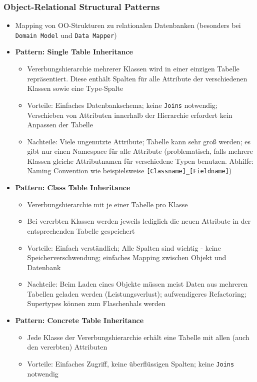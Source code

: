 \subsubsection{Object-Relational Structural Patterns}
\begin{itemize}
	\item Mapping von OO-Strukturen zu relationalen Datenbanken (besonders bei \texttt{Domain Model} und \texttt{Data Mapper})
	\item \textbf{Pattern: Single Table Inheritance}
	\begin{itemize}
		\item Vererbungshierarchie mehrerer Klassen wird in einer einzigen Tabelle repräsentiert. Diese enthält Spalten für alle Attribute der verschiedenen Klassen sowie eine Type-Spalte
		\item Vorteile: Einfaches Datenbankschema; keine \texttt{Joins} notwendig; Verschieben von Attributen innerhalb der Hierarchie erfordert kein Anpassen der Tabelle
		\item Nachteile: Viele ungenutzte Attribute; Tabelle kann sehr groß werden; es gibt nur einen Namespace für alle Attribute (problematisch, falls mehrere Klassen gleiche Attributnamen für verschiedene Typen benutzen. Abhilfe: Naming Convention wie beispielsweise \texttt{[Classname]\_[Fieldname]})
	\end{itemize}
	\item \textbf{Pattern: Class Table Inheritance}
	\begin{itemize}
		\item Vererbungshierarchie mit je einer Tabelle pro Klasse
		\item Bei vererbten Klassen werden jeweils lediglich die neuen Attribute in der entsprechenden Tabelle gespeichert
		\item Vorteile: Einfach verständlich; Alle Spalten sind wichtig - keine Speicherverschwendung; einfaches Mapping zwischen Objekt und Datenbank
		\item Nachteile: Beim Laden eines Objekte müssen meist Daten aus mehreren Tabellen geladen werden (Leistungsverlust); aufwendigeres Refactoring; Supertypes können zum Flaschenhals werden
	\end{itemize}
	\item \textbf{Pattern: Concrete Table Inheritance}
	\begin{itemize}
		\item Jede Klasse der Vererbungshierarchie erhält eine Tabelle mit allen (auch den vererbten) Attributen
		\item Vorteile: Einfaches Zugriff, keine überflüssigen Spalten; keine \texttt{Joins} notwendig

\end{itemize}
\end{itemize}
